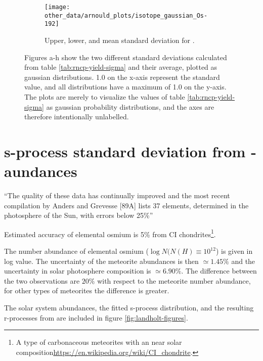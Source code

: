 \begin{figure}
\begin{subfigure}{\subfiglength}
  \end{subfigure}
  \begin{subfigure}{\subfiglength}
    \centering
    \texttt{[image: other\_data/arnould\_plots/isotope\_gaussian\_Os-192]}
    \caption{Upper, lower, and mean standard deviation for .}
  \end{subfigure}
  \caption{\label{fig:arnould-gauss-dist}
    Figures a-h show the two different standard deviations calculated from table \ref{tab:rncp-yield-sigma} and their average, plotted as gaussian distributions.
    1.0 on the x-axis represent the standard value, and all distributions have a maximum of 1.0 on the y-axis.
    The plots are merely to visualize the values of table \ref{tab:rncp-yield-sigma} as gaussian probability distributions, and the axes are therefore intentionally unlabelled.
  }
\end{figure}
\FloatBarrier

\section{s-process standard deviation from \sos-aundances}
``The quality of these data has continually improved and the most recent compilation by
Anders and Grevesse [89A] lists 37 elements, determined in the photosphere of the Sun, with errors below
25\%''

Estimated accuracy of elemental osmium is 5\% from CI chondrites\footnote{A type of carbonaceous meteorites with an near solar composition\url{https://en.wikipedia.org/wiki/CI_chondrite}.}.

The number abundance of elemental osmium ($\log N(N(H)\equiv 10^{12}$) is given in log value. The uncertainty of the meteorite abundances is then $\simeq 1.45\%$ and the uncertainty in solar photosphere composition is $\simeq 6.90\%$. The difference between the two observations are $20\%$ with respect to the meteorite number abundance, for other types of meteorites the difference is greater.

The solar system abundances, the fitted s-process distribution, and the resulting r-processes from  are included in figure \ref{fig:landholt-figures}.

